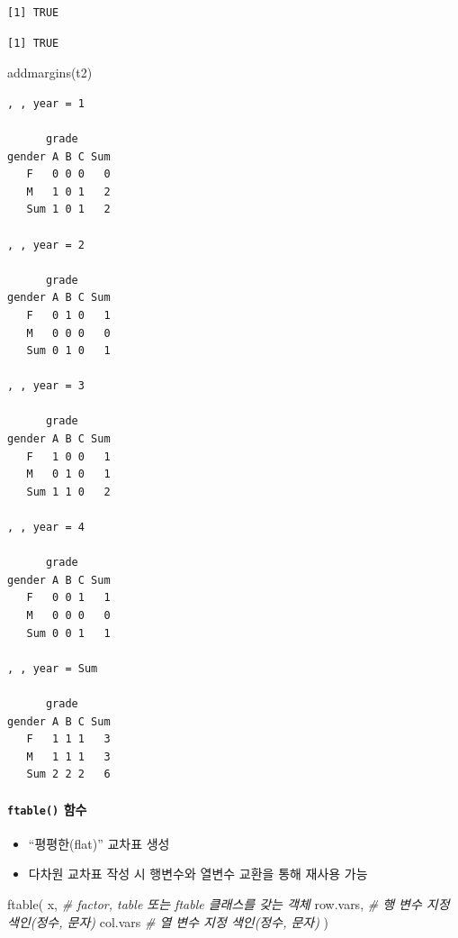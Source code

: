 \documentclass[
  11pt,
]{krantz}
\newenvironment{Shaded}{\begin{snugshade}}{\end{snugshade}}
\newcommand{\CommentTok}[1]{\textcolor[rgb]{0.37,0.37,0.37}{\textit{#1}}}
\newcommand{\FunctionTok}[1]{\textcolor[rgb]{0,0,0}{#1}}
\newcommand{\NormalTok}[1]{#1}
\providecommand{\tightlist}{%
  \setlength{\itemsep}{0pt}\setlength{\parskip}{0pt}}
\begin{document}
\begin{verbatim}
[1] TRUE
\end{verbatim}

\begin{verbatim}
[1] TRUE
\end{verbatim}

\begin{Shaded}
\begin{Highlighting}[]
\FunctionTok{addmargins}\NormalTok{(t2)}
\end{Highlighting}
\end{Shaded}

\begin{verbatim}
, , year = 1

      grade
gender A B C Sum
   F   0 0 0   0
   M   1 0 1   2
   Sum 1 0 1   2

, , year = 2

      grade
gender A B C Sum
   F   0 1 0   1
   M   0 0 0   0
   Sum 0 1 0   1

, , year = 3

      grade
gender A B C Sum
   F   1 0 0   1
   M   0 1 0   1
   Sum 1 1 0   2

, , year = 4

      grade
gender A B C Sum
   F   0 0 1   1
   M   0 0 0   0
   Sum 0 0 1   1

, , year = Sum

      grade
gender A B C Sum
   F   1 1 1   3
   M   1 1 1   3
   Sum 2 2 2   6
\end{verbatim}

\normalsize

\hypertarget{tab-fun3}{%
\paragraph*{\texorpdfstring{\texttt{ftable()} 함수}{ftable() 함수}}\label{tab-fun3}}

\begin{itemize}
\tightlist
\item
  ``평평한(flat)'' 교차표 생성
\item
  다차원 교차표 작성 시 행변수와 열변수 교환을 통해 재사용 가능
\end{itemize}

\footnotesize

\begin{Shaded}
\begin{Highlighting}[]
\FunctionTok{ftable}\NormalTok{(}
\NormalTok{  x,  }\CommentTok{\# factor, table 또는 ftable 클래스를 갖는 객체}
\NormalTok{  row.vars, }\CommentTok{\# 행 변수 지정 색인(정수, 문자)}
\NormalTok{  col.vars  }\CommentTok{\# 열 변수 지정 색인(정수, 문자)}
\NormalTok{)}
\end{Highlighting}
\end{Shaded}
\end{document}
